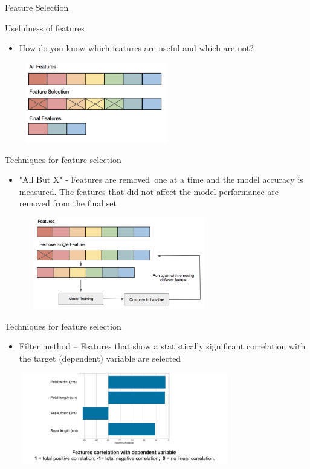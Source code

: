 \documentclass[aspectratio=169,14pt,usenames,dvipsnames]{beamer}
\begin{document}
\begin{frame}{}
\centering
\color{orange}
\large Feature Selection
\end{frame}

\begin{frame}{Usefulness of features}
\begin{itemize}
\item How do you know which features are useful and which are not?\\
\end{itemize}
\centering
\includegraphics[width=8cm , height=3.5cm]{Images/AIML_FD_IMG3.png}

\end{frame}

\begin{frame}{Techniques for feature selection}
\begin{itemize}
\item "All But X" - Features are removed one at a time and the model accuracy is measured. The features that did not affect the model performance are removed from the final set\\
\end{itemize}
\centering
\includegraphics[width=10cm , height=4cm]{Images/AIML_FD_IMG4.png}
\end{frame}

\begin{frame}{Techniques for feature selection}
\begin{itemize}
\item Filter method – Features that show a statistically significant correlation with the target (dependent) variable are selected\\
\end{itemize}
\centering
\includegraphics[width=10.5cm , height=4cm]{Images/AIML_FD_IMG5.png}

\end{frame}
\end{document}
